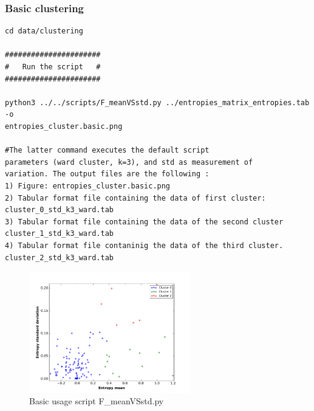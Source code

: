 \documentclass[a4paper,11pt]{report}
\begin{document}
\subsubsection{Basic clustering}
\begin{verbatim}
cd data/clustering

######################
#   Run the script   #
######################

python3 ../../scripts/F_meanVSstd.py ../entropies_matrix_entropies.tab -o 
entropies_cluster.basic.png

#The latter command executes the default script 
parameters (ward cluster, k=3), and std as measurement of 
variation. The output files are the following :
1) Figure: entropies_cluster.basic.png
2) Tabular format file containing the data of first cluster: 
cluster_0_std_k3_ward.tab
3) Tabular format file containing the data of the second cluster 
cluster_1_std_k3_ward.tab
4) Tabular format file contaninig the data of the third cluster. 
cluster_2_std_k3_ward.tab
\end{verbatim}
\begin{figure}[H]
  \centering
    \includegraphics[width=70mm, scale=1]{entropies_cluster_basic.png}
    \caption{Basic usage script F\_meanVSstd.py}
        \label{fig:cluster_basic}
\end{figure}
\end{document}
